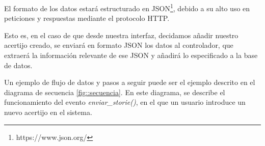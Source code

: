 El formato de los datos estará estructurado en JSON\footnote{https://www.json.org/}, debido a su alto uso en peticiones y respuestas mediante el protocolo HTTP.

Esto es, en el caso de que desde nuestra interfaz, decidamos añadir nuestro acertijo creado, se enviará en formato JSON los datos al controlador, que extraerá la información relevante de ese JSON y añadirá lo especificado a la base de datos.

Un ejemplo de flujo de datos y pasos a seguir puede ser el ejemplo descrito en el diagrama de secuencia \ref{fig::secuencia}. En este diagrama, se describe el funcionamiento del evento \textit{enviar\_storie()}, en el que un usuario introduce un nuevo acertijo en el sistema.
